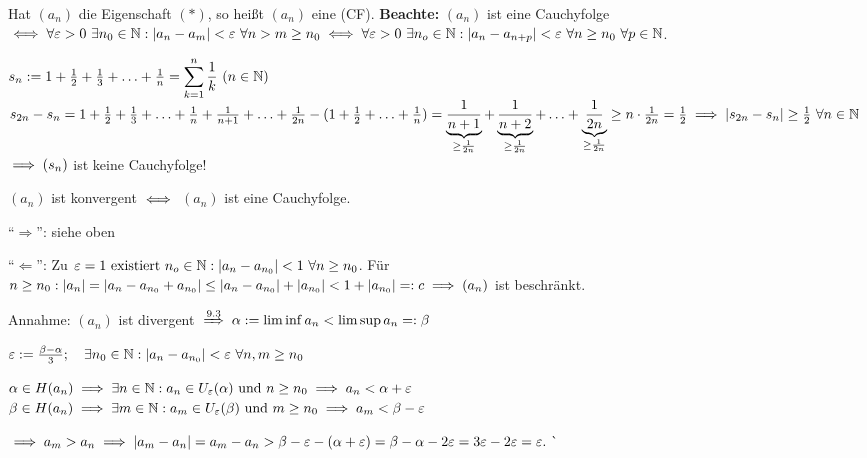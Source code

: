 \documentclass[a4paper,twoside,DIV15,BCOR12mm]{scrbook}
\begin{document}
\begin{definition}
Hat $(a_n)$ die Eigenschaft $(*)$, so heißt $(a_n)$ eine  (CF).
\textbf{Beachte:} $(a_n)$ ist eine Cauchyfolge $\iff \forall \varepsilon > 0 \ \exists n_0 \in\mathbb{N}: |a_n-a_m| < \varepsilon \ \forall n>m\ge n_0 \iff \forall \varepsilon >0 \ \exists n_o\in\mathbb{N}: |a_n - a_{n+p}| < \varepsilon \ \forall n\ge n_0 \ \forall p \in\mathbb{N}$.
\end{definition}

\begin{beispiel}
$s_n := 1 + \frac{1}{2} + \frac{1}{3} + \ldots + \frac{1}{n} = \displaystyle\sum_{k=1}^n \frac{1}{k} \ (n\in\MdN)$\\
$s_{2n} - s_n = 1 + \frac{1}{2} + \frac{1}{3} + \ldots + \frac{1}{n} + \frac{1}{n+1} + \ldots + \frac{1}{2n} - (1+ \frac{1}{2} + \ldots + \frac{1}{n}) =  \underbrace{\frac{1}{n+1}}_{\ge\frac{1}{2n}} + \underbrace{\frac{1}{n+2}}_{\ge\frac{1}{2n}} + \ldots + \underbrace{\frac{1}{2n}}_{\ge \frac{1}{2n}} \ge n \cdot \frac{1}{2n} = \frac{1}{2} \implies |s_{2n} - s_n| \ge \frac{1}{2} \ \forall n\in\mathbb{N}$
$\implies (s_n)$ ist keine Cauchyfolge!
\end{beispiel}

\begin{satz}
$(a_n)$ ist konvergent $\iff$ $(a_n)$ ist eine Cauchyfolge.
\end{satz}

\begin{beweis}
"`$\Rightarrow$"': siehe oben

"`$\Leftarrow$"': Zu $\varepsilon=1 \text{ existiert } n_o\in\mathbb{N}: |a_n-a_{n_0}| < 1\ \forall n \ge n_0$. Für $n \ge n_0: |a_n| = |a_n-a_{n_0}+a_{n_0}| \le |a_n-a_{n_0}| + |a_{n_0}| < 1+|a_{n_0}| =: c \implies (a_n)$ ist beschränkt.

Annahme: $(a_n)$ ist divergent $\folgtnach{9.3} \alpha := \lim\inf a_n < \lim\sup a_n =: \beta$

$\varepsilon:=\frac{\beta-\alpha}{3};\quad\exists n_0\in\mathbb{N}: |a_n-a_{n_0}| < \varepsilon\ \forall n,m \ge n_0$

$\alpha \in H(a_n) \implies \exists n\in\mathbb{N}: a_n \in U_{\varepsilon}(\alpha)\text{ und } n \ge n_0 \implies a_n<\alpha+\varepsilon$\\
$\beta \in H(a_n) \implies \exists m\in\mathbb{N}: a_m \in U_{\varepsilon}(\beta)\text{ und } m \ge n_0 \implies a_m<\beta-\varepsilon$

$\implies a_m > a_n \implies |a_m-a_n| = a_m-a_n > \beta-\varepsilon-(\alpha+\varepsilon) = \beta-\alpha-2\varepsilon = 3\varepsilon-2\varepsilon = \varepsilon.\ \lightning$
\end{beweis}
\end{document}
